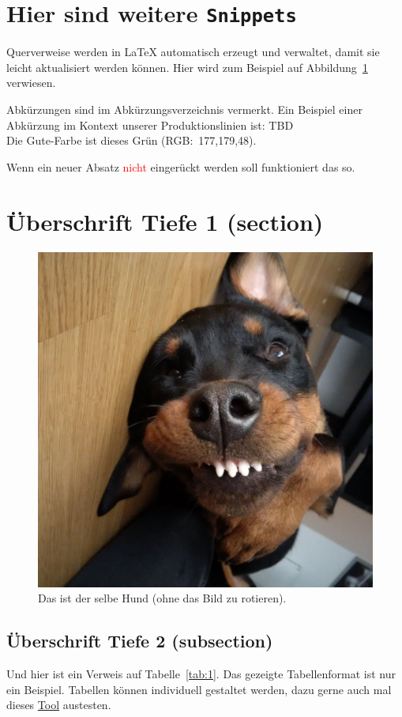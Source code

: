 
\section{Hier sind weitere \texttt{Snippets}}

Querverweise werden in \LaTeX{} automatisch erzeugt und verwaltet, damit sie leicht aktualisiert werden können. 
Hier wird zum Beispiel auf Abbildung~\ref{Abb:hund} verwiesen.

Abkürzungen sind im Abkürzungsverzeichnis vermerkt. Ein Beispiel einer Abkürzung im Kontext unserer Produktionslinien ist: \ac{TBD}\\

Die \glqq{}Gute-Farbe\grqq{} ist \textcolor{FAVgreen}{dieses Grün (RGB:~177,179,48)}.

\noindent Wenn ein neuer Absatz \textcolor{red}{nicht} eingerückt werden soll funktioniert das so.

\section{Überschrift Tiefe 1 (section)}
    
    \begin{figure}[!htbp]
        \centering
        \includegraphics[width=0.7\linewidth]{PICs/hund.png}
        \caption{Das ist der selbe Hund (ohne das Bild zu rotieren).}
        \label{Abb:hund}
    \end{figure}
    
    \clearpage
        \subsection{Überschrift Tiefe 2 (subsection)}
        Und hier ist ein Verweis auf Tabelle~\ref{tab:1}. Das gezeigte Tabellenformat ist nur ein Beispiel. 
        Tabellen können individuell gestaltet werden, dazu gerne auch mal dieses \hyperref{https://www.tablesgenerator.com/}{category}{name}{Tool} austesten.\\
    
